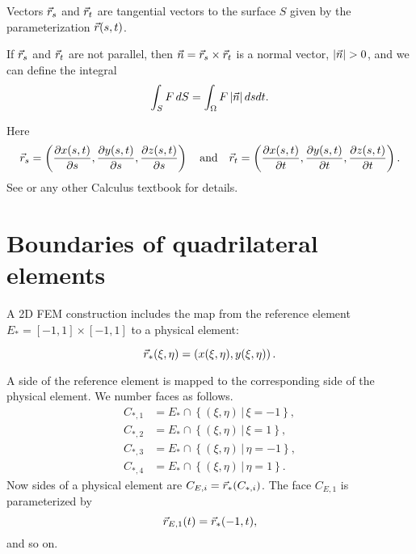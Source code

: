 \documentclass[11pt]{article}
\begin{document}
Vectors $\vec r_{s}$ and $\vec r_{t}$ are tangential vectors to the surface $S$
given by the parameterization $\vec r(s,t)$.

If $\vec r_{s}$ and $\vec r_{t}$ are not parallel, then $\vec n = \vec r_{s} \times \vec r_{t}$ is
a normal vector, $| \vec n | > 0$, and we can define
the integral
\begin{equation}
\label{eq:3}
\int_{S} F\, dS = \int_{\Omega} F\, |\vec n|\, ds dt.
\end{equation}

Here
\begin{equation}
\label{eq:5}
\vec r_{s} = \left(\frac{\partial x(s,t)}{\partial s}, \frac{\partial y(s,t)}{\partial s}, \frac{\partial z(s,t)}{\partial s}\right) \quad \text{and} \quad
\vec r_{t} = \left(\frac{\partial x(s,t)}{\partial t}, \frac{\partial y(s,t)}{\partial t}, \frac{\partial z(s,t)}{\partial t}\right).
\end{equation}
See \cite{Nikolsky1977} or any other Calculus textbook for details.


\section{Boundaries of quadrilateral elements}
\label{sec-3}

A 2D FEM construction includes the map from the reference element
$E_{*} = [-1, 1] \times [-1,1]$ to a physical element:

\begin{equation}
\label{eq:20}
\vec r_{*}(\xi,\eta) = \left( x(\xi,\eta), y(\xi,\eta) \right).
\end{equation}

A side of the reference element is mapped to the corresponding side of
the physical element. We number faces as follows.
\begin{equation}
\label{eq:21}
\begin{aligned}
C_{*,1} &=  E_{*} \cap \left \{ (\xi, \eta)\, |\, \xi = -1 \right \},\\
C_{*,2} &=  E_{*} \cap \left \{ (\xi, \eta)\, |\, \xi = 1  \right \},\\
C_{*,3} &=  E_{*} \cap \left \{ (\xi, \eta)\, |\, \eta = -1 \right \},\\
C_{*,4} &=  E_{*} \cap \left \{ (\xi, \eta)\, |\, \eta = 1  \right \}.
\end{aligned}
\end{equation}
Now sides of a physical element are $C_{E,i} = \vec r_{*}(C_{*,i})$. The
face $C_{E,1}$ is parameterized by
\begin{equation}
\label{eq:22}
\vec r_{E,1}(t) = \vec r_{*}(-1, t),
\end{equation}
and so on.
\end{document}
